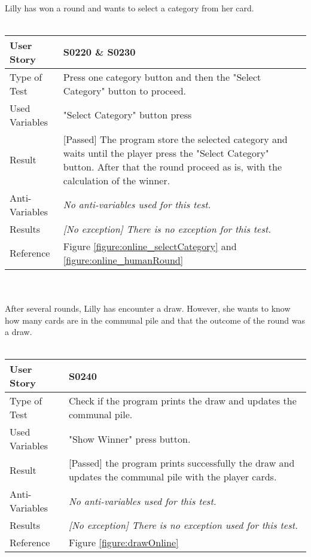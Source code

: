 \vspace{0.2cm}\\  
Lilly has won a round and wants to select a category from her card.\\
\vspace{0.2cm}\\ 
\begin{tabular}{l | p{12cm}}
User Story & \textbf{S0220 \& S0230}\\ \hline
Type of Test & Press one category button and then the "Select Category" button to proceed.\\ \hline
Used Variables & "Select Category" button press\\ \hline
Result & [Passed] The program store the selected category and waits until the player press the "Select Category" button. After that the round proceed as is, with the calculation of the winner.\\ \hline
Anti-Variables & \emph{No anti-variables used for this test.}\\ \hline
Results & \emph{[No exception] There is no exception for this test.}\\ \hline
Reference & Figure \ref{figure:online_selectCategory} and \ref{figure:online_humanRound} \\ \hline
\end{tabular}\\
\vspace{0.2cm}\\
After several rounds, Lilly has encounter a draw. However, she wants to know how many cards are in the communal pile and that the outcome of the round was a draw.\\
\vspace{0.2cm}\\   
\begin{tabular}{l | p{12cm}}
User Story & \textbf{S0240}\\ \hline
Type of Test & Check if the program prints the draw and updates the communal pile.\\ \hline
Used Variables & "Show Winner" press button.\\ \hline
Result & [Passed] the program prints successfully the draw and updates the communal pile with the player cards.\\ \hline
Anti-Variables & \emph{No anti-variables used for this test.}\\ \hline
Results & \emph{[No exception] There is no exception used for this test.}\\ \hline
Reference & Figure \ref{figure:drawOnline} \\ \hline
\end{tabular}\\
